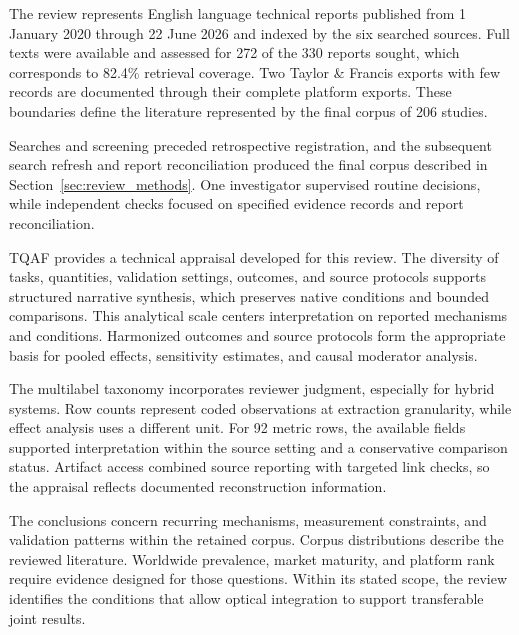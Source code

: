 The review represents English language technical reports published from 1
January 2020 through 22 June 2026 and indexed by the six searched sources. Full
texts were available and assessed for 272 of the 330 reports sought, which
corresponds to 82.4\% retrieval coverage. Two Taylor \& Francis exports with few
records are documented through their complete platform exports. These
boundaries define the literature represented by the final corpus of 206 studies.

Searches and screening preceded retrospective registration, and the subsequent
search refresh and report reconciliation produced the final corpus described
in Section~\ref{sec:review_methods}. One investigator supervised routine
decisions, while independent checks focused on specified evidence records and
report reconciliation.

TQAF provides a technical appraisal developed for this review. The diversity
of tasks, quantities, validation settings, outcomes, and source protocols
supports structured narrative synthesis, which preserves native conditions and
bounded comparisons. This analytical scale centers interpretation on reported
mechanisms and conditions. Harmonized outcomes and source protocols form the
appropriate basis for pooled effects, sensitivity estimates, and causal
moderator analysis.

The multilabel taxonomy incorporates reviewer judgment, especially for hybrid
systems. Row counts represent coded observations at extraction granularity,
while effect analysis uses a different unit. For 92 metric rows, the available
fields supported interpretation within the source setting and a conservative
comparison status. Artifact access combined source reporting with targeted link
checks, so the appraisal reflects documented reconstruction information.

The conclusions concern recurring mechanisms, measurement constraints, and
validation patterns within the retained corpus. Corpus distributions describe
the reviewed literature. Worldwide prevalence, market maturity, and platform
rank require evidence designed for those questions. Within its stated scope,
the review identifies the conditions that allow optical integration to support
transferable joint results.
